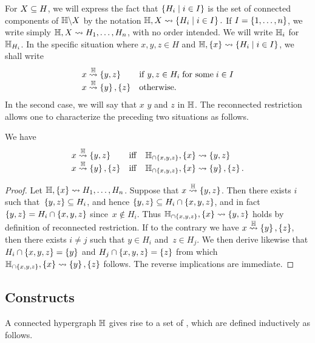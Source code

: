 For $X\subseteq H$, we will express the fact that $\left\{H_i \mid i\in I\right\}$ is the set of connected components of ${\mathbb H}\backslash X$ by the notation ${\mathbb H},X  \leadsto  \left\{H_i \mid i\in I\right\}.$
If $I=\left\{1,\ldots,n\right\}$, we write simply ${\mathbb H},X  \leadsto H_1,\ldots,H_n$, with no order intended.
We will write ${\mathbb H}_i$ for ${\mathbb H}_{H_i}$.
In the specific situation where $x,y,z\in H$ and ${\mathbb H},\left\{x\right\}\leadsto \left\{H_i \mid i\in I\right\}$, we shall write
$$\begin{array}{ll}
x\stackrel{{\mathbb H}}{\rightsquigarrow}\left\{y,z\right\} & \mathrm{if}\; y,z\in H_i\; \mbox{for some}\; i \in I\\
x\stackrel{{\mathbb H}}{\rightsquigarrow}\left\{y\right\},\left\{z\right\} & \mbox{otherwise}.
\end{array}$$
In the second case, we will say that $x$  $y$ and $z$ in ${\mathbb H}$. 
The reconnected restriction allows one to characterize the preceding two situations as follows.

\begin{lemma} 
\label{xyz-reconnected} 
We have
$$\begin{array}{lll}
x\stackrel{{\mathbb H}}{\rightsquigarrow}\left\{y,z\right\} & \mathrm{iff} & {\mathbb H}_{\cap \left\{x,y,z\right\}},\left\{x\right\}\leadsto\left\{y,z\right\} \\
x\stackrel{{\mathbb H}}{\rightsquigarrow}\left\{y\right\},\left\{z\right\} & \mathrm{iff} & {\mathbb H}_{\cap \left\{x,y,z\right\}},\left\{x\right\}\leadsto \left\{y\right\},\left\{z\right\}.
\end{array}$$
\end{lemma}

\begin{proof} 
    Let ${\mathbb H},\left\{x\right\}\leadsto H_1,\ldots,H_n$. 
    Suppose that $x\stackrel{{\mathbb H}}{\rightsquigarrow}\left\{y,z\right\}$. 
    Then there exists $i$ such that~$\left\{y,z\right\}\subseteq H_i$, and hence $\left\{y,z\right\}\subseteq H_i\cap\left\{x,y,z\right\}$, and in fact $\left\{y,z\right\} = H_i\cap\left\{x,y,z\right\}$ since~$x\not\in H_i$. 
    Thus ${\mathbb H}_{\cap \left\{x,y,z\right\}},\left\{x\right\}\leadsto\left\{y,z\right\}$ holds by definition of reconnected restriction.
    If to the contrary we have $x\stackrel{{\mathbb H}}{\rightsquigarrow}\left\{y\right\},\left\{z\right\}$, then there exists $i\neq j$ such that $y\in H_i$ and~$z\in H_j$. 
    We then derive likewise that $H_i\cap\left\{x,y,z\right\}=\left\{y\right\}$ and $H_j\cap\left\{x,y,z\right\}=\left\{z\right\}$ from which $ {\mathbb H}_{\cap \left\{x,y,z\right\}},\left\{x\right\}\leadsto \left\{y\right\},\left\{z\right\}$ follows.
    The reverse implications are immediate.
\end{proof}


\subsection{Constructs}
A {connected} hypergraph ${\mathbb H}$ gives rise to a set of , which are defined inductively as follows.
 
